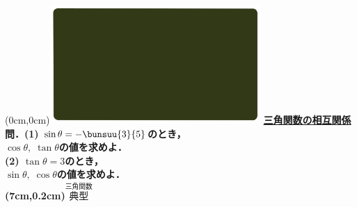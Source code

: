 \documentclass[10pt,
fleqn,
dvipdfmx,
uplatex
]{jsarticle}
\begin{document}
\at(0cm,0cm){\includegraphics[width=8cm,bb=0 0 1920 1080]{./media_local/smart_background/三角関数.jpeg}}
{\color{orange}\bf\boldmath\LARGE\underline{三角関数の相互関係}}\vspace{0.3zw}\\
\Large 
\bf\boldmath 問．(1)  $\sin \theta =-\bunsuu{3}{5}$のとき，\\\hspace{2zw}$\cos \theta ,\;\tan \theta$の値を求めよ．\\
(2)  $\tan \theta =3$のとき，\\\hspace{2zw}$\sin \theta ,\;\cos \theta$の値を求めよ．\\

\at(7cm,0.2cm){\small\color{bradorange}$\overset{\text{三角関数}}{\text{典型}}$}
\end{document}
